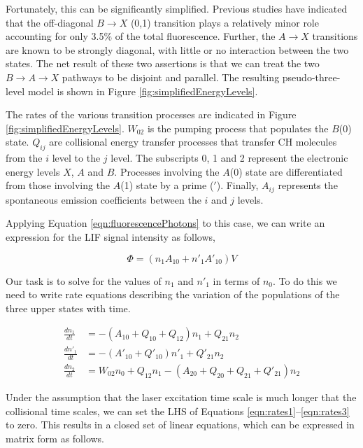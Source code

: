 Fortunately, this can be significantly simplified.
Previous studies\cite{1996-luque-c,2000-luque} have indicated that the off-diagonal \(B\rightarrow X\) (0,1) transition plays a relatively minor role accounting for only 3.5\% of the total fluorescence.
Further, the \(A\rightarrow X\) transitions are known\cite{1996-luque-b} to be strongly diagonal, with little or no interaction\cite{1985-garland-b} between the two states.
The net result of these two assertions is that we can treat the two \(B\rightarrow A\rightarrow X\) pathways to be disjoint and parallel.
The resulting pseudo-three-level model is shown in Figure \ref{fig:simplifiedEnergyLevels}.



The rates of the various transition processes are indicated in Figure \ref{fig:simplifiedEnergyLevels}.
\(W_{02}\) is the pumping process that populates the \(B\)(0) state.
\(Q_{ij}\) are collisional energy transfer processes that transfer CH molecules from the \(i\) level to the \(j\) level.
The subscripts 0, 1 and 2 represent the electronic energy levels \(X\), \(A\) and \(B\).
Processes involving the \(A\)(0) state are differentiated from those involving the \(A\)(1) state by a prime (\('\)).
Finally, \(A_{ij}\) represents the spontaneous emission coefficients between the \(i\) and \(j\) levels.

Applying Equation \ref{eqn:fluorescencePhotons} to this case, we can write an expression for the LIF signal intensity as follows,

\begin{equation}
  \Phi = ( n_1 A_{10} + n'_1 A'_{10} )V
  \label{eqn:signalIntensity}
\end{equation}

Our task is to solve for the values of \(n_1\) and \(n'_1\) in terms of \(n_0\).
To do this we need to write rate equations describing the variation of the populations of the three upper states with time.

\begin{align}
  \frac{dn_1}{dt} &= -( A_{10} + Q_{10} + Q_{12} )n_1 + Q_{21} n_2
  \label{eqn:rates1}\\
  \frac{dn'_1}{dt} &= -( A'_{10} + Q'_{10} )n'_1 + Q'_{21} n_2
  \label{eqn:rates2}\\
  \frac{dn_2}{dt} &= W_{02} n_0 + Q_{12} n_1 - ( A_{20} + Q_{20} + Q_{21} + Q'_{21} )n_2
  \label{eqn:rates3}
\end{align}

Under the assumption that the laser excitation time scale is much longer that the collisional time scales, we can set the LHS of Equations \ref{eqn:rates1}--\ref{eqn:rates3} to zero.
This results in a closed set of linear equations, which can be expressed in matrix form as follows.

